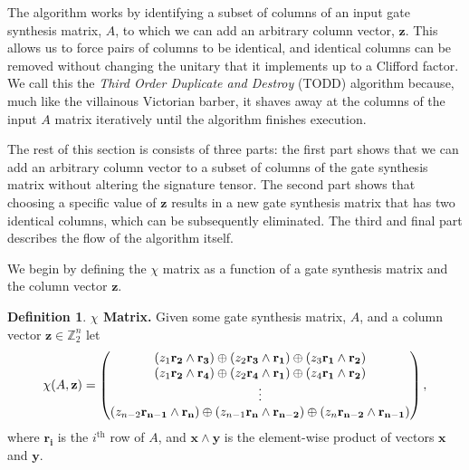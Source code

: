\documentclass[titlepage]{article}
\theoremstyle{definition}
\newtheorem{definition}{Definition}[section]
\theoremstyle{problem}
\theoremstyle{lemma}
\begin{document}
The algorithm works by identifying a subset of columns of an input gate synthesis matrix, $A$, to which we can add an arbitrary column vector, $\mathbf{z}$. This allows us to force pairs of columns to be identical, and identical columns can be removed without changing the unitary that it implements up to a Clifford factor. We call this the \emph{Third Order Duplicate and Destroy} (TODD) algorithm because, much like the villainous Victorian barber, it shaves away at the columns of the input $A$ matrix iteratively until the algorithm finishes execution.

The rest of this section is consists of three parts: the first part shows that we can add an arbitrary column vector to a subset of columns of the gate synthesis matrix without altering the signature tensor. The second part shows that choosing a specific value of $\mathbf{z}$ results in a new gate synthesis matrix that has two identical columns, which can be subsequently eliminated. The third and final part describes the flow of the algorithm itself.

We begin by defining the $\chi$ matrix as a function of a gate synthesis matrix and the column vector $\mathbf{z}$.
\theoremstyle{definition}
\begin{definition}{\textbf{$\chi$ Matrix.}}
	Given some gate synthesis matrix, $A$, and a column vector $\mathbf{z}\in\mathbb{Z}_2^n$ let					
	\begin{equation*}
	\chi(A,\mathbf{z}) = \normalsize\begin{pmatrix}
	(z_1\mathbf{r_2}\wedge\mathbf{r_3})\oplus (z_2\mathbf{r_3}\wedge\mathbf{r_1})\oplus (z_3\mathbf{r_1}\wedge\mathbf{r_2})\\
	(z_1\mathbf{r_2}\wedge\mathbf{r_4})\oplus (z_2\mathbf{r_4}\wedge\mathbf{r_1})\oplus (z_4\mathbf{r_1}\wedge\mathbf{r_2})\\
	\vdots \\
	(z_{n-2}\mathbf{r_{n-1}}\wedge\mathbf{r_{n}})\oplus (z_{n-1}\mathbf{r_{n}}\wedge\mathbf{r_{n-2}})\oplus (z_{n}\mathbf{r_{n-2}}\wedge\mathbf{r_{n-1}})\\
	\end{pmatrix}\large,
	\end{equation*}
	where $\mathbf{r_i}$ is the $i^{\text{th}}$ row of $A$, and $\mathbf{x}\wedge\mathbf{y}$ is the element-wise product of vectors $\mathbf{x}$ and $\mathbf{y}$.
\end{definition}

		
\end{document}
